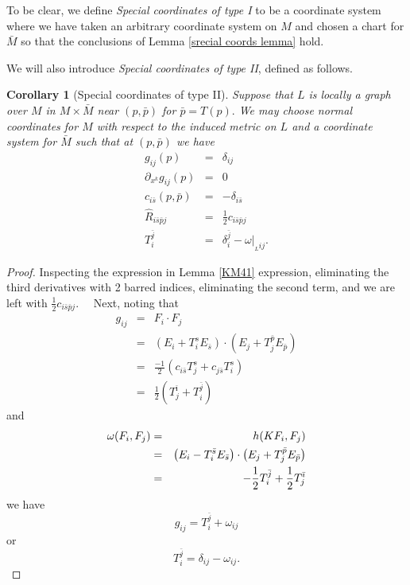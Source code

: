 \documentclass[12pt,letterpaper]{amsart}%
\newcounter{mycounter}
\numberwithin{mycounter}{section}
\theoremstyle{plain}
\newtheorem{corollary}[mycounter]{Corollary}
\numberwithin{equation}{section}
\theoremstyle{definition}
\begin{document}
To be clear, we define \textit{Special coordinates of type I} to be a coordinate system where we have taken an arbitrary coordinate system on $M$ and chosen a chart for $\bar{M}$ so that the conclusions of Lemma \ref{srecial coords lemma} hold.  

We will also introduce \textit{Special coordinates of type II}, defined as follows.



\begin{corollary}[Special coordinates of type II]\label{IIcoords}
Suppose that $L$ is locally a graph over $M$ in $M\times \bar{M}$ near $(p,%
\bar{p})$ for $\bar{p}=T(p).$ We may choose normal coordinates for $M$ with
respect to the induced metric on $L$ and a coordinate system for $\bar{M}$
such that at $\left( p,\bar{p}\right) $ we have%
\begin{eqnarray*}
g_{ij}(p) &=&\delta _{ij} \\
\partial_{x^{k}}g_{ij}(p) &=&0 \\
c_{i\bar{s}}(p,\bar{p}) &=&-\delta _{i\bar{s}} \\
\hat{R}_{i\bar{s}\bar{p}j} &=&\frac{1}{2}c_{i\bar{s}\bar{p}j} \\
T_{i}^{\bar{j}} &=&\delta _{i}^{\bar{j}}-\omega |_{_{L}ij}.
\end{eqnarray*}
\end{corollary}


\begin{proof}
Inspecting the expression in Lemma \ref{KM41}
expression, eliminating the third derivatives with 2 barred indices, eliminating the second term, and we are left
with  $\frac{1}{2}c_{i\bar{s}\bar{p}j}.$ \ \ Next, noting that 
\begin{eqnarray*}
g_{ij} &=&F_{i}\cdot F_{j} \\
&=&\left( E_{i}+T_{i}^{s}E_{\bar{s}}\right) \cdot \left( E_{j}+T_{j}^{\bar{p}%
}E_{\bar{p}}\right)  \\
&=&\frac{-1}{2}\left( c_{i\bar{s}}T_{j}^{s}+c_{j\bar{s}}T_{i}^{s}\right)  \\
&=&\frac{1}{2}\left( T_{j}^{\bar{\imath}}+T_{i}^{\bar{j}}\right) 
\end{eqnarray*}%
and 
\begin{eqnarray*}
\omega (F_{i},F_{j}) &=&h(KF_{i},F_{j}) \\
&=&\left( E_{i}-T_{i}^{\bar{s}}E_{\bar{s}}\right) \cdot \left( E_{j}+T_{j}^{%
\bar{p}}E_{\bar{p}}\right)  \\
&=&-\frac{1}{2}T_{i}^{\bar{j}}+\frac{1}{2}T_{j}^{\bar{\imath}}
\end{eqnarray*}%
we have  
\[
g_{ij}=T_{i}^{\bar{j}}+\omega _{ij}
\]%
or  
\[
T_{i}^{\bar{j}}=\delta _{ij}-\omega _{ij}.
\]
\end{proof}
\end{document}

